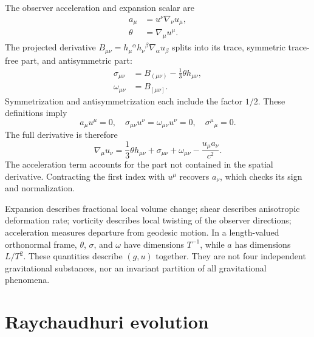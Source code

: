 \documentclass[11pt]{article}
\begin{document}
The observer acceleration and expansion scalar are
\begin{align}
a_\mu&=u^\nu\nabla_\nu u_\mu,\label{eq:acceleration}\\
\theta&=\nabla_\mu u^\mu.\label{eq:expansion}
\end{align}
The projected derivative $B_{\mu\nu}=h_\mu{}^\alpha h_\nu{}^\beta\nabla_\alpha u_\beta$ splits into its trace, symmetric trace-free part, and antisymmetric part:
\begin{align}
\sigma_{\mu\nu}&=B_{(\mu\nu)}-\frac13\theta h_{\mu\nu},
\label{eq:shear}\\
\omega_{\mu\nu}&=B_{[\mu\nu]}.
\label{eq:vorticity}
\end{align}
Symmetrization and antisymmetrization each include the factor $1/2$. These definitions imply
\begin{equation}
a_\mu u^\mu=0,\quad \sigma_{\mu\nu}u^\nu=\omega_{\mu\nu}u^\nu=0,
\quad \sigma^\mu{}_{\mu}=0.
\label{eq:kinematicprops}
\end{equation}
The full derivative is therefore
\begin{equation}
\boxed{\nabla_\mu u_\nu=\frac13\theta h_{\mu\nu}
+\sigma_{\mu\nu}+\omega_{\mu\nu}-\frac{u_\mu a_\nu}{c^2}.}
\label{eq:flowdecomp}
\end{equation}
The acceleration term accounts for the part not contained in the spatial derivative. Contracting the first index with $u^\mu$ recovers $a_\nu$, which checks its sign and normalization.

Expansion describes fractional local volume change; shear describes anisotropic deformation rate; vorticity describes local twisting of the observer directions; acceleration measures departure from geodesic motion. In a length-valued orthonormal frame, $\theta$, $\sigma$, and $\omega$ have dimensions $T^{-1}$, while $a$ has dimensions $L/T^2$. These quantities describe $(g,u)$ together. They are not four independent gravitational substances, nor an invariant partition of all gravitational phenomena.

\section{Raychaudhuri evolution}
\end{document}
